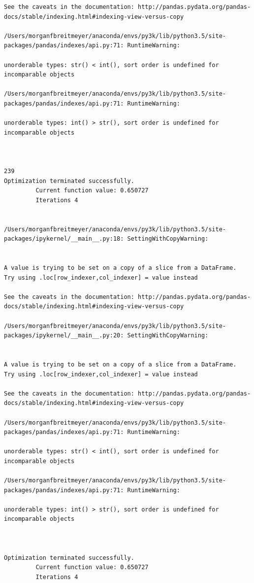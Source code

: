 \begin{lstlisting}
See the caveats in the documentation: http://pandas.pydata.org/pandas-docs/stable/indexing.html#indexing-view-versus-copy

/Users/morganfbreitmeyer/anaconda/envs/py3k/lib/python3.5/site-packages/pandas/indexes/api.py:71: RuntimeWarning:

unorderable types: str() < int(), sort order is undefined for incomparable objects

/Users/morganfbreitmeyer/anaconda/envs/py3k/lib/python3.5/site-packages/pandas/indexes/api.py:71: RuntimeWarning:

unorderable types: int() > str(), sort order is undefined for incomparable objects



239
Optimization terminated successfully.
         Current function value: 0.650727
         Iterations 4


/Users/morganfbreitmeyer/anaconda/envs/py3k/lib/python3.5/site-packages/ipykernel/__main__.py:18: SettingWithCopyWarning:


A value is trying to be set on a copy of a slice from a DataFrame.
Try using .loc[row_indexer,col_indexer] = value instead

See the caveats in the documentation: http://pandas.pydata.org/pandas-docs/stable/indexing.html#indexing-view-versus-copy

/Users/morganfbreitmeyer/anaconda/envs/py3k/lib/python3.5/site-packages/ipykernel/__main__.py:20: SettingWithCopyWarning:


A value is trying to be set on a copy of a slice from a DataFrame.
Try using .loc[row_indexer,col_indexer] = value instead

See the caveats in the documentation: http://pandas.pydata.org/pandas-docs/stable/indexing.html#indexing-view-versus-copy

/Users/morganfbreitmeyer/anaconda/envs/py3k/lib/python3.5/site-packages/pandas/indexes/api.py:71: RuntimeWarning:

unorderable types: str() < int(), sort order is undefined for incomparable objects

/Users/morganfbreitmeyer/anaconda/envs/py3k/lib/python3.5/site-packages/pandas/indexes/api.py:71: RuntimeWarning:

unorderable types: int() > str(), sort order is undefined for incomparable objects



Optimization terminated successfully.
         Current function value: 0.650727
         Iterations 4



\end{lstlisting}
